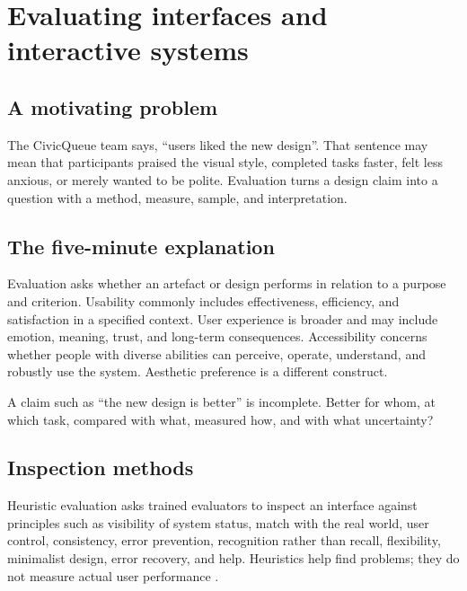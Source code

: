 \chapter{Evaluating interfaces and interactive systems}
\label{ch:evaluation}

\section{A motivating problem}
The CivicQueue team says, \enquote{users liked the new design}. That sentence may mean that participants praised the visual style, completed tasks faster, felt less anxious, or merely wanted to be polite. Evaluation turns a design claim into a question with a method, measure, sample, and interpretation.


\section{The five-minute explanation}
Evaluation asks whether an artefact or design performs in relation to a purpose and criterion. Usability commonly includes effectiveness, efficiency, and satisfaction in a specified context. User experience is broader and may include emotion, meaning, trust, and long-term consequences. Accessibility concerns whether people with diverse abilities can perceive, operate, understand, and robustly use the system. Aesthetic preference is a different construct.

A claim such as \enquote{the new design is better} is incomplete. Better for whom, at which task, compared with what, measured how, and with what uncertainty?

\section{Inspection methods}
Heuristic evaluation asks trained evaluators to inspect an interface against principles such as visibility of system status, match with the real world, user control, consistency, error prevention, recognition rather than recall, flexibility, minimalist design, error recovery, and help. Heuristics help find problems; they do not measure actual user performance \citep{nielsen1990heuristic}.

